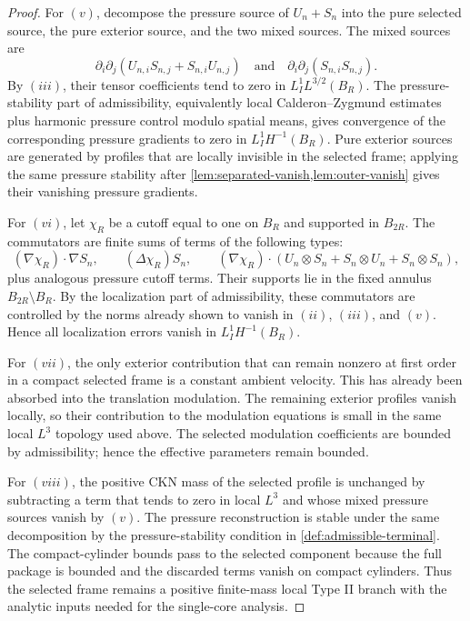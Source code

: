 \documentclass[11pt]{amsart}
\theoremstyle{plain}
\theoremstyle{definition}
\theoremstyle{remark}
\begin{document}
\begin{proof}
For \((v)\), decompose the pressure source of \(U_n+S_n\) into the pure selected
source, the pure exterior source, and the two mixed sources.  The mixed sources
are
\[
  \partial_i\partial_j(U_{n,i}S_{n,j}+S_{n,i}U_{n,j})
  \quad\text{and}\quad
  \partial_i\partial_j(S_{n,i}S_{n,j}).
\]
By \((iii)\), their tensor coefficients tend to zero in
\(L^1_IL^{3/2}(B_R)\).  The pressure-stability part of admissibility,
equivalently local Calderon--Zygmund estimates plus harmonic pressure control
modulo spatial means, gives convergence of the corresponding pressure gradients
to zero in \(L^1_IH^{-1}(B_R)\).  Pure exterior sources are generated by
profiles that are locally invisible in the selected frame; applying the same
pressure stability after \cref{lem:separated-vanish,lem:outer-vanish} gives
their vanishing pressure gradients.

For \((vi)\), let \(\chi_R\) be a cutoff equal to one on \(B_R\) and supported
in \(B_{2R}\).  The commutators are finite sums of terms of the following
types:
\[
  (\nabla\chi_R)\cdot\nabla S_n,
  \qquad
  (\Delta\chi_R)S_n,
  \qquad
  (\nabla\chi_R)\cdot (U_n\otimes S_n+S_n\otimes U_n+S_n\otimes S_n),
\]
plus analogous pressure cutoff terms.  Their supports lie in the fixed annulus
\(B_{2R}\setminus B_R\).  By the localization part of admissibility, these
commutators are controlled by the norms already shown to vanish in \((ii)\),
\((iii)\), and \((v)\).  Hence all localization errors vanish in
\(L^1_IH^{-1}(B_R)\).

For \((vii)\), the only exterior contribution that can remain nonzero at first
order in a compact selected frame is a constant ambient velocity.  This has
already been absorbed into the translation modulation.  The remaining exterior
profiles vanish locally, so their contribution to the modulation equations is
small in the same local \(L^3\) topology used above.  The selected modulation
coefficients are bounded by admissibility; hence the effective parameters remain
bounded.

For \((viii)\), the positive CKN mass of the selected profile is unchanged by
subtracting a term that tends to zero in local \(L^3\) and whose
mixed pressure sources vanish by \((v)\).  The pressure reconstruction is stable
under the same decomposition by the pressure-stability condition in
\cref{def:admissible-terminal}.  The compact-cylinder bounds pass to the
selected component because the full package is bounded and the discarded terms
vanish on compact cylinders.  Thus the selected frame remains a positive
finite-mass local Type II branch with the analytic inputs needed for the
single-core analysis.
\end{proof}
\end{document}
